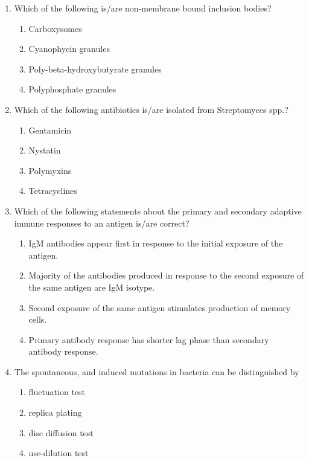 \documentclass[journal,12pt,onecolumn]{IEEEtran}
\begin{document}
\begin{enumerate}
    \item Which of the following is/are non-membrane bound inclusion bodies?
    \begin{enumerate}
        \item Carboxysomes
        \item Cyanophycin granules
        \item Poly-beta-hydroxybutyrate granules
        \item Polyphosphate granules
    \end{enumerate}

    \item Which of the following antibiotics is/are isolated from Streptomyces spp.?
    \begin{enumerate}
        \item Gentamicin
        \item Nystatin
        \item Polymyxins
        \item Tetracyclines
    \end{enumerate}

    \item Which of the following statements about the primary and secondary adaptive immune responses to an antigen is/are correct?
    \begin{enumerate}
        \item IgM antibodies appear first in response to the initial exposure of the antigen.
        \item Majority of the antibodies produced in response to the second exposure of the same antigen are IgM isotype.
        \item Second exposure of the same antigen stimulates production of memory cells.
        \item Primary antibody response has shorter lag phase than secondary antibody response.
    \end{enumerate}

    \item The spontaneous, and induced mutations in bacteria can be distinguished by
    \begin{enumerate}
        \item fluctuation test
        \item replica plating
        \item disc diffusion test
        \item use-dilution test
    \end{enumerate}


\end{enumerate}
\end{document}
